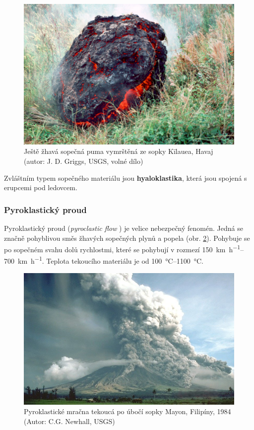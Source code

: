 \begin{figure}[h]
	\centering
	\includegraphics[width=1\linewidth]{obrazky/sopky/puma}
	\caption{Ještě žhavá sopečná puma vymrštěná ze sopky Kīlauea, Havaj (autor: J. D. Griggs, USGS, volné dílo)}
	\label{fig:puma}
\end{figure}


Zvláštním typem sopečného materiálu jsou \textbf{hyaloklastika}, která jsou spojená s erupcemi pod ledovcem. 

\subsubsection{Pyroklastický proud}
Pyroklastický proud (\textit{pyroclastic flow
}) je velice nebezpečný fenomén. Jedná se značně pohyblivou směs žhavých sopečných plynů a popela (obr. \ref{fig:pyroclastic}). Pohybuje se po sopečném svahu dolů rychlostmi, které se pohybují v rozmezí \SIrange{150}{700}{\kilo\metre\per\hour}. Teplota tekoucího materiálu je od \SIrange{100}{1100}{\celsius}.

\begin{figure}[h]
	\centering
	\includegraphics[width=1\linewidth]{obrazky/sopky/pyroclastic}
	\caption{Pyroklastické mračna tekoucá po úbočí sopky Mayon, Filipíny, 1984 (Autor:  C.G. Newhall, USGS)}
	\label{fig:pyroclastic}
\end{figure}


